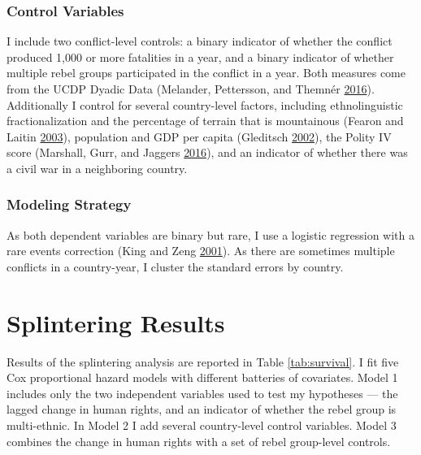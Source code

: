 \documentclass[12pt,]{book}
\theoremstyle{definition}
\theoremstyle{definition}
\theoremstyle{definition}
\theoremstyle{remark}
\begin{document}
\hypertarget{control-variables-3}{%
\subsubsection*{Control Variables}\label{control-variables-3}}

I include two conflict-level controls: a binary indicator of whether the
conflict produced 1,000 or more fatalities in a year, and a binary
indicator of whether multiple rebel groups participated in the conflict
in a year. Both measures come from the UCDP Dyadic Data (Melander,
Pettersson, and Themnér \protect\hyperlink{ref-Melander2016}{2016}).
Additionally I control for several country-level factors, including
ethnolinguistic fractionalization and the percentage of terrain that is
mountainous (Fearon and Laitin
\protect\hyperlink{ref-fearonlaitin03}{2003}), population and GDP per
capita (Gleditsch \protect\hyperlink{ref-Gleditsch2002b}{2002}), the
Polity IV score (Marshall, Gurr, and Jaggers
\protect\hyperlink{ref-Marshall2016}{2016}), and an indicator of whether
there was a civil war in a neighboring country.

\hypertarget{modeling-strategy}{%
\subsubsection*{Modeling Strategy}\label{modeling-strategy}}

As both dependent variables are binary but rare, I use a logistic
regression with a rare events correction (King and Zeng
\protect\hyperlink{ref-King2001a}{2001}). As there are sometimes
multiple conflicts in a country-year, I cluster the standard errors by
country.

\hypertarget{splintering-results}{%
\section{Splintering Results}\label{splintering-results}}

Results of the splintering analysis are reported in Table
\ref{tab:survival}. I fit five Cox proportional hazard models with
different batteries of covariates. Model 1 includes only the two
independent variables used to test my hypotheses --- the lagged change
in human rights, and an indicator of whether the rebel group is
multi-ethnic. In Model 2 I add several country-level control variables.
Model 3 combines the change in human rights with a set of rebel
group-level controls.
\end{document}

